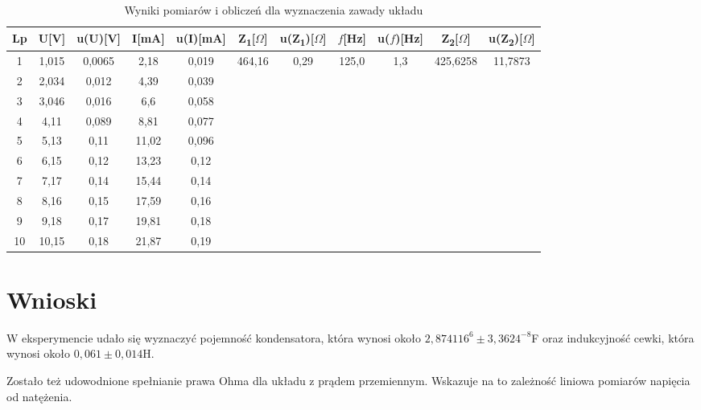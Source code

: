 \documentclass[12pt]{article}
\begin{document}
\begin{table}[h]
    \centering
    \caption{Wyniki pomiarów i obliczeń dla wyznaczenia zawady układu}
    \begin{tabular}{|c|c|c|c|c|c|c|c|c|c|c|}
    \hline
    Lp & U[V] & u(U)[V] & I[mA] & u(I)[mA] & Z\textsubscript{1}[$\Omega$] & u(Z\textsubscript{1})[$\Omega$] & $f$[Hz] & u($f$)[Hz] & Z\textsubscript{2}[$\Omega$] & u(Z\textsubscript{2})[$\Omega$] \\ \hline
    1 & 1,015 & 0,0065 & 2,18 & 0,019 & \multirow{10}{*}{464,16} & \multirow{10}{*}{0,29} & \multirow{10}{*}{125,0} & \multirow{10}{*}{1,3} & \multirow{10}{*}{425,6258} & \multirow{10}{*}{11,7873} \\ \cline{1-5}
    2 & 2,034 & 0,012 & 4,39 & 0,039 & ~ & ~ & ~ & ~ & ~ & ~ \\ \cline{1-5}
    3 & 3,046 & 0,016 & 6,6 & 0,058 & ~ & ~ & ~ & ~ & ~ & ~ \\ \cline{1-5}
    4 & 4,11 & 0,089 & 8,81 & 0,077 & ~ & ~ & ~ & ~ & ~ & ~ \\ \cline{1-5}
    5 & 5,13 & 0,11 & 11,02 & 0,096 & ~ & ~ & ~ & ~ & ~ & ~ \\ \cline{1-5}
    6 & 6,15 & 0,12 & 13,23 & 0,12 & ~ & ~ & ~ & ~ & ~ & ~ \\ \cline{1-5}
    7 & 7,17 & 0,14 & 15,44 & 0,14 & ~ & ~ & ~ & ~ & ~ & ~ \\ \cline{1-5}
    8 & 8,16 & 0,15 & 17,59 & 0,16 & ~ & ~ & ~ & ~ & ~ & ~ \\ \cline{1-5}
    9 & 9,18 & 0,17 & 19,81 & 0,18 & ~ & ~ & ~ & ~ & ~ & ~ \\ \cline{1-5}
    10 & 10,15 & 0,18 & 21,87 & 0,19 & ~ & ~ & ~ & ~ & ~ & ~ \\ \hline
    \end{tabular}
\end{table}

\section{Wnioski}

W eksperymencie udało się wyznaczyć pojemność kondensatora, która wynosi około $2,874116^{6} \pm 3,3624^{-8}$F oraz indukcyjność cewki,
która wynosi około $ 0,061 \pm 0,014 $H.

Zostało też udowodnione spełnianie prawa Ohma dla układu z prądem przemiennym. Wskazuje na to zależność liniowa pomiarów napięcia od natężenia.
\end{document}

